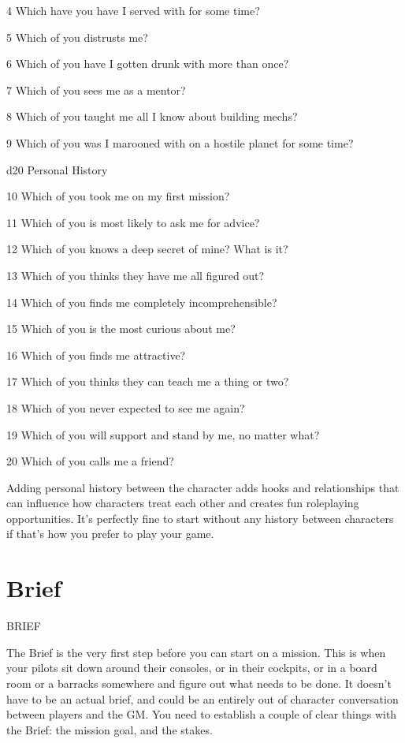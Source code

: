  4         Which have you have I served with for some time?

 5         Which of you distrusts me?

 6         Which of you have I gotten drunk with more than once?

 7         Which of you sees me as a mentor?

 8         Which of you taught me all I know about building mechs?

 9         Which of you was I marooned with on a hostile planet for some time?




 d20       Personal	History

  10       Which of you took me on my first mission?

  11       Which of you is most likely to ask me for advice?

  12       Which of you knows a deep secret of mine? What is it?

  13       Which of you thinks they have me all figured out?

  14       Which of you finds me completely incomprehensible?

  15       Which of you is the most curious about me?

  16       Which of you finds me attractive?

  17       Which of you thinks they can teach me a thing or two?

  18       Which of you never expected to see me again?

  19       Which of you will support and stand by me, no matter what?

  20       Which of you calls me a friend?

Adding personal history between the character adds hooks and relationships that can influence
how characters treat each other and creates fun roleplaying opportunities. It’s perfectly fine to
start without any history between characters if that’s how you prefer to play your game.

\chapter{Brief}
                                                     BRIEF


The Brief is the very first step before you can start on a mission. This is when your pilots sit down
around their consoles, or in their cockpits, or in a board room or a barracks somewhere and
figure out what needs to be done. It doesn’t have to be an actual brief, and could be an entirely
out of character conversation between players and the GM. You need to establish a couple of
clear things with the Brief: the mission goal, and the stakes.


